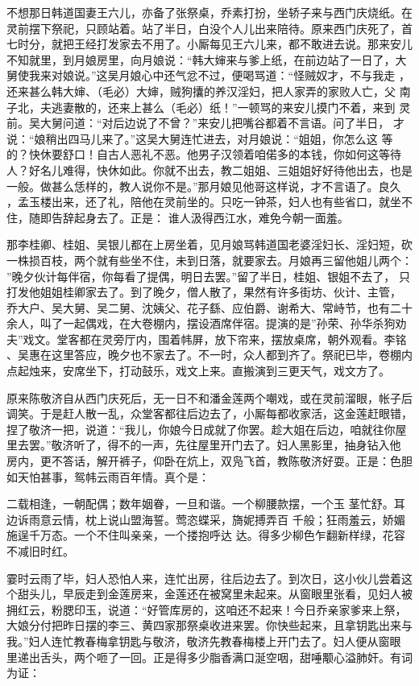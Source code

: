 不想那日韩道国妻王六儿，亦备了张祭桌，乔素打扮，坐轿子来与西门庆烧纸。在
灵前摆下祭祀，只顾站着。站了半日，白没个人儿出来陪待。原来西门庆死了，首
七时分，就把王经打发家去不用了。小厮每见王六儿来，都不敢进去说。那来安儿
不知就里，到月娘房里，向月娘说：“韩大婶来与爹上纸，在前边站了一日了，大
舅使我来对娘说。”这吴月娘心中还气忿不过，便喝骂道：“怪贼奴才，不与我走
，还来甚么韩大婶、（毛必）大婶，贼狗攮的养汉淫妇，把人家弄的家败人亡，父
南子北，夫逃妻散的，还来上甚么（毛必）纸！”一顿骂的来安儿摸门不着，来到
灵前。吴大舅问道：“对后边说了不曾？”来安儿把嘴谷都着不言语。问了半日，
才说：“娘稍出四马儿来了。”这吴大舅连忙进去，对月娘说：“姐姐，你怎么这
等的？快休要舒口！自古人恶礼不恶。他男子汉领着咱偌多的本钱，你如何这等待
人？好名儿难得，快休如此。你就不出去，教二姐姐、三姐姐好好待他出去，也是
一般。做甚么恁样的，教人说你不是。”那月娘见他哥这样说，才不言语了。良久
，孟玉楼出来，还了礼，陪他在灵前坐的。只吃一钟茶，妇人也有些省口，就坐不
住，随即告辞起身去了。正是：
谁人汲得西江水，难免今朝一面羞。

那李桂卿、桂姐、吴银儿都在上房坐着，见月娘骂韩道国老婆淫妇长、淫妇短，砍
一株损百枝，两个就有些坐不住，未到日落，就要家去。月娘再三留他姐儿两个：
”晚夕伙计每伴宿，你每看了提偶，明日去罢。”留了半日，桂姐、银姐不去了，
只打发他姐姐桂卿家去了。到了晚夕，僧人散了，果然有许多街坊、伙计、主管，
乔大户、吴大舅、吴二舅、沈姨父、花子繇、应伯爵、谢希大、常峙节，也有二十
余人，叫了一起偶戏，在大卷棚内，摆设酒席伴宿。提演的是”孙荣、孙华杀狗劝
夫”戏文。堂客都在灵旁厅内，围着帏屏，放下帘来，摆放桌席，朝外观看。李铭
、吴惠在这里答应，晚夕也不家去了。不一时，众人都到齐了。祭祀已毕，卷棚内
点起烛来，安席坐下，打动鼓乐，戏文上来。直搬演到三更天气，戏文方了。

原来陈敬济自从西门庆死后，无一日不和潘金莲两个嘲戏，或在灵前溜眼，帐子后
调笑。于是赶人散一乱，众堂客都往后边去了，小厮每都收家活，这金莲赶眼错，
捏了敬济一把，说道：“我儿，你娘今日成就了你罢。趁大姐在后边，咱就往你屋
里去罢。”敬济听了，得不的一声，先往屋里开门去了。妇人黑影里，抽身钻入他
房内，更不答话，解开裤子，仰卧在炕上，双凫飞首，教陈敬济好耍。正是：色胆
如天怕甚事，鸳帏云雨百年情。真个是：

二载相逢，一朝配偶；数年姻眷，一旦和谐。一个柳腰款摆，一个玉
茎忙舒。耳边诉雨意云情，枕上说山盟海誓。莺恣蝶采，旖妮搏弄百
千般；狂雨羞云，娇媚施逞千万态。一个不住叫亲亲，一个搂抱呼达
达。得多少柳色乍翻新样绿，花容不减旧时红。

霎时云雨了毕，妇人恐怕人来，连忙出房，往后边去了。到次日，这小伙儿尝着这
个甜头儿，早辰走到金莲房来，金莲还在被窝里未起来。从窗眼里张看，见妇人被
拥红云，粉腮印玉，说道：“好管库房的，这咱还不起来！今日乔亲家爹来上祭，
大娘分付把昨日摆的李三、黄四家那祭桌收进来罢。你快些起来，且拿钥匙出来与
我。”妇人连忙教春梅拿钥匙与敬济，敬济先教春梅楼上开门去了。妇人便从窗眼
里递出舌头，两个咂了一回。正是得多少脂香满口涎空咽，甜唾颙心溢肺奸。有词
为证：

